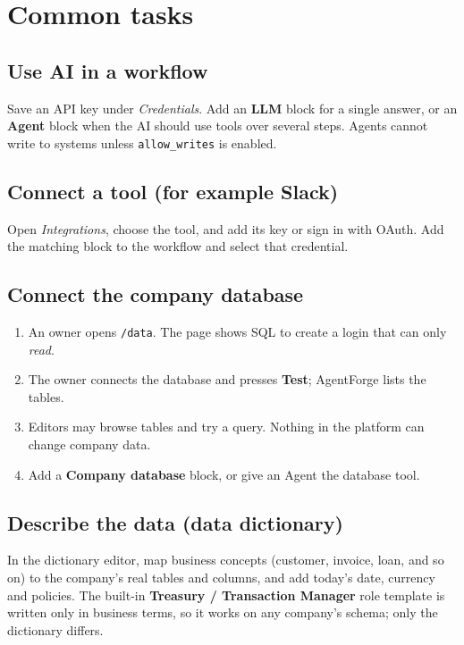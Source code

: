 \documentclass[11pt,a4paper]{article}
\begin{document}
\section{Common tasks}

\subsection{Use AI in a workflow}
Save an API key under \emph{Credentials}. Add an \textbf{LLM} block for a single
answer, or an \textbf{Agent} block when the AI should use tools over several
steps. Agents cannot write to systems unless \texttt{allow\_writes} is enabled.

\subsection{Connect a tool (for example Slack)}
Open \emph{Integrations}, choose the tool, and add its key or sign in with OAuth.
Add the matching block to the workflow and select that credential.

\subsection{Connect the company database}
\begin{enumerate}[nosep]
  \item An owner opens \texttt{/data}. The page shows SQL to create a login that can only \emph{read}.
  \item The owner connects the database and presses \textbf{Test}; AgentForge lists the tables.
  \item Editors may browse tables and try a query. Nothing in the platform can change company data.
  \item Add a \textbf{Company database} block, or give an Agent the database tool.
\end{enumerate}

\subsection{Describe the data (data dictionary)}
In the dictionary editor, map business concepts (customer, invoice, loan, and so on)
to the company's real tables and columns, and add today's date, currency and
policies. The built-in \textbf{Treasury / Transaction Manager} role template is
written only in business terms, so it works on any company's schema; only the
dictionary differs.
\end{document}
